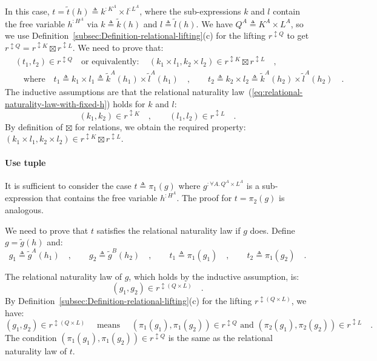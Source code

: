 In this case, $t=\tilde{t}(h)\triangleq k^{:K^{A}}\times l^{:L^{A}}$,
where the sub-expressions $k$ and $l$ contain the free variable
$h^{:H^{A}}$ via $k\triangleq\tilde{k}(h)$ and $l\triangleq\tilde{l}(h)$.
We have $Q^{A}\triangleq K^{A}\times L^{A}$, so we use Definition~\ref{subsec:Definition-relational-lifting}(c)
for the lifting $r^{\updownarrow Q}$ to get $r^{\updownarrow Q}=r^{\updownarrow K}\boxtimes r^{\updownarrow L}$.
We need to prove that:
\begin{align*}
 & (t_{1},t_{2})\in r^{\updownarrow Q}\quad\text{or equivalently}:\quad(k_{1}\times l_{1},k_{2}\times l_{2})\in r^{\updownarrow K}\boxtimes r^{\updownarrow L}\quad,\\
 & \quad\text{where}\quad t_{1}\triangleq k_{1}\times l_{1}\triangleq\tilde{k}^{A}(h_{1})\times\tilde{l}^{A}(h_{1})\quad,\quad\quad t_{2}\triangleq k_{2}\times l_{2}\triangleq\tilde{k}^{A}(h_{2})\times\tilde{l}^{A}(h_{2})\quad.
\end{align*}
The inductive assumptions are that the relational naturality law~(\ref{eq:relational-naturality-law-with-fixed-h})
holds for $k$ and $l$:
\[
(k_{1},k_{2})\in r^{\updownarrow K}\quad,\quad\quad(l_{1},l_{2})\in r^{\updownarrow L}\quad.
\]
By definition of $\boxtimes$ for relations, we obtain the required
property: $(k_{1}\times l_{1},k_{2}\times l_{2})\in r^{\updownarrow K}\boxtimes r^{\updownarrow L}$.

\paragraph{Use tuple}

It is sufficient to consider the case $t\triangleq\pi_{1}(g)$ where
$g^{:\forall A.\,Q^{A}\times L^{A}}$ is a sub-expression that contains
the free variable $h^{:H^{A}}$. The proof for $t=\pi_{2}(g)$ is
analogous. 

We need to prove that $t$ satisfies the relational naturality law
if $g$ does. Define $g=\tilde{g}(h)$ and:
\[
g_{1}\triangleq\tilde{g}^{A}(h_{1})\quad,\quad\quad g_{2}\triangleq\tilde{g}^{B}(h_{2})\quad,\quad\quad t_{1}\triangleq\pi_{1}(g_{1})\quad,\quad\quad t_{2}\triangleq\pi_{1}(g_{2})\quad.
\]

The relational naturality law of $g$, which holds by the inductive
assumption, is:
\[
(g_{1},g_{2})\in r^{\updownarrow(Q\times L)}\quad.
\]
By Definition~\ref{subsec:Definition-relational-lifting}(c) for
the lifting $r^{\updownarrow(Q\times L)}$, we have:
\[
(g_{1},g_{2})\in r^{\updownarrow(Q\times L)}\quad\text{ means }\quad(\pi_{1}(g_{1}),\pi_{1}(g_{2}))\in r^{\updownarrow Q}\text{ and }(\pi_{2}(g_{1}),\pi_{2}(g_{2}))\in r^{\updownarrow L}\quad.
\]
The condition $(\pi_{1}(g_{1}),\pi_{1}(g_{2}))\in r^{\updownarrow Q}$
is the same as the relational naturality law of $t$.


